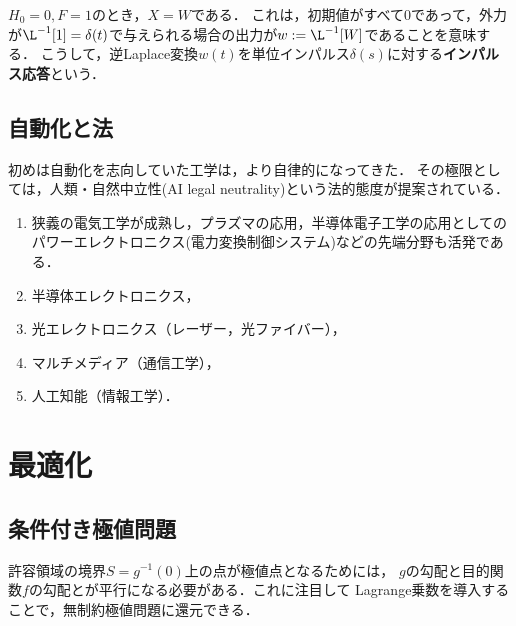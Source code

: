 \documentclass[uplatex,dvipdfmx]{jsreport}
\begin{document}
\begin{observation}
    $H_0=0,F=1$のとき，$X=W$である．
    これは，初期値がすべて$0$であって，外力が$\L^{-1}[1]=\delta(t)$で与えられる場合の出力が$w:=\L^{-1}[W]$であることを意味する．
    こうして，逆Laplace変換$w(t)$を単位インパルス$\delta(s)$に対する\textbf{インパルス応答}という．
\end{observation}

\section{自動化と法}

\begin{tcolorbox}[colframe=ForestGreen, colback=ForestGreen!10!white,breakable,colbacktitle=ForestGreen!40!white,coltitle=black,fonttitle=\bfseries\sffamily,
title=]
    初めは自動化を志向していた工学は，より自律的になってきた．
    その極限としては，人類・自然中立性(AI legal neutrality)という法的態度が提案されている．
\end{tcolorbox}

\begin{enumerate}
    \item 狭義の電気工学が成熟し，プラズマの応用，半導体電子工学の応用としてのパワーエレクトロニクス(電力変換制御システム)などの先端分野も活発である．
    \item 半導体エレクトロニクス，
    \item 光エレクトロニクス（レーザー，光ファイバー），
    \item マルチメディア（通信工学），
    \item 人工知能（情報工学）．
\end{enumerate}

\chapter{最適化}

\section{条件付き極値問題}

\begin{tcolorbox}[colframe=ForestGreen, colback=ForestGreen!10!white,breakable,colbacktitle=ForestGreen!40!white,coltitle=black,fonttitle=\bfseries\sffamily,
title=]
    許容領域の境界$S=g^{-1}(0)$上の点が極値点となるためには，
    $g$の勾配と目的関数$f$の勾配とが平行になる必要がある．これに注目して
    Lagrange乗数を導入することで，無制約極値問題に還元できる．
\end{tcolorbox}
\end{document}
